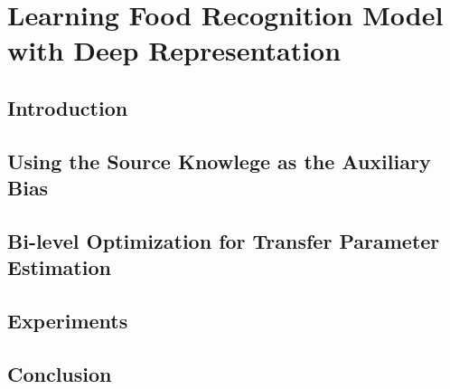 \chapter{Learning Food Recognition Model with Deep Representation}
\section{Introduction}

\section{Using the Source Knowlege as the Auxiliary Bias}\label{sec:prob}


\section{Bi-level Optimization for Transfer Parameter Estimation}\label{sec:smitle}

%

\section{Experiments}\label{sec:exp}


\section{Conclusion}
